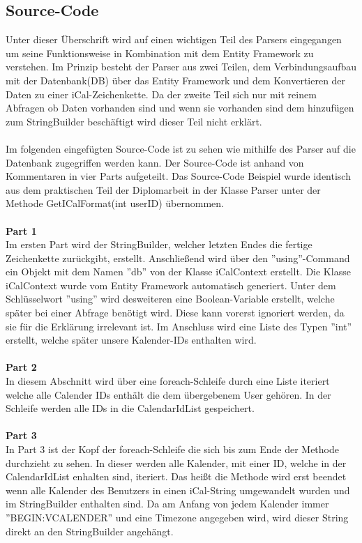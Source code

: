\subsection{Source-Code}
\label{sec:parser-sourcecode}
Unter dieser Überschrift wird auf einen wichtigen Teil des Parsers eingegangen um seine Funktionsweise in Kombination mit dem Entity Framework zu verstehen. Im Prinzip besteht der Parser aus zwei Teilen, dem Verbindungsaufbau mit der Datenbank(DB) über das Entity Framework und dem Konvertieren der Daten zu einer iCal-Zeichenkette. Da der zweite Teil sich nur mit reinem Abfragen ob Daten vorhanden sind und wenn sie vorhanden sind dem hinzufügen zum StringBuilder beschäftigt wird dieser Teil nicht erklärt.\\ \\
Im folgenden eingefügten Source-Code ist zu sehen wie mithilfe des Parser auf die Datenbank zugegriffen werden kann. Der Source-Code ist anhand von Kommentaren in vier Parts aufgeteilt. Das Source-Code Beispiel wurde identisch aus dem praktischen Teil der Diplomarbeit in der Klasse Parser unter der Methode GetICalFormat(int userID) übernommen. \\ \\
\textbf{Part 1} \\
Im ersten Part wird der StringBuilder, welcher letzten Endes die fertige Zeichenkette zurückgibt, erstellt. Anschließend wird über den ''using''-Command ein Objekt mit dem Namen ''db'' von der Klasse iCalContext erstellt. Die Klasse iCalContext wurde vom Entity Framework automatisch generiert. Unter dem Schlüsselwort ''using'' wird desweiteren eine Boolean-Variable erstellt, welche später bei einer Abfrage benötigt wird. Diese kann vorerst ignoriert werden, da sie für die Erklärung irrelevant ist. Im Anschluss wird eine Liste des Typen ''int'' erstellt, welche später unsere Kalender-IDs enthalten wird. \\ \\
\textbf{Part 2} \\
In diesem Abschnitt wird über eine foreach-Schleife durch eine Liste iteriert welche alle Calender IDs enthält die dem übergebenem User gehören. In der Schleife werden alle IDs in die CalendarIdList gespeichert. \\ \\
\textbf{Part 3} \\
In Part 3 ist der Kopf der foreach-Schleife die sich bis zum Ende der Methode durchzieht zu sehen. In dieser werden alle Kalender, mit einer ID, welche in der CalendarIdList enhalten sind, iteriert. Das heißt die Methode wird erst beendet wenn alle Kalender des Benutzers in einen iCal-String umgewandelt wurden und im StringBuilder enthalten sind. Da am Anfang von jedem Kalender immer ''BEGIN:VCALENDER'' und eine Timezone angegeben wird, wird dieser String direkt an den StringBuilder angehängt. \\ \\
